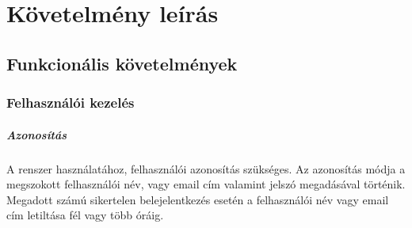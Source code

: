 \makeatletter
\def\thickhrulefill{\leavevmode \leaders \hrule height 1ex \hfill \kern \z@}
\def\@makechapterhead#1{%
  \vspace*{10\p@}%
  {\parindent \z@ \centering \reset@font
        {\Huge \scshape \thechapter}
        \par\nobreak
        \vspace*{15\p@}%
        \interlinepenalty\@M
        \begin{tabular}{@{\qquad}c@{\qquad}}
          \hline
          \\
          {\Huge \bfseries #1\par\nobreak} \\
          \\
          \hline
        \end{tabular}
    \vskip 100\p@
  }}
\def\@makeschapterhead#1{%
  \vspace*{10\p@}%
  {\parindent \z@ \centering \reset@font
        {\Huge \scshape \vphantom{\thechapter}}
        \par\nobreak
        \vspace*{15\p@}%
        \interlinepenalty\@M
        \begin{tabular}{@{\qquad}c@{\qquad}}
          \hline
          \\
          {\Huge \bfseries #1\par\nobreak} \\
          \\
          \hline
        \end{tabular}
    \vskip 100\p@
  }}

\chapter{Követelmény leírás}
  
\section{Funkcionális követelmények}
\subsection{Felhasználói kezelés} %
\label{sub:felhasználói}
  \paragraph{Azonosítás} A renszer használatához, felhasználói azonosítás szükséges. Az azonosítás módja a megszokott felhasználói név, vagy email cím valamint jelszó megadásával történik. Megadott számú sikertelen belejelentkezés esetén a felhasználói név vagy email cím letiltása fél vagy több óráig.
  
